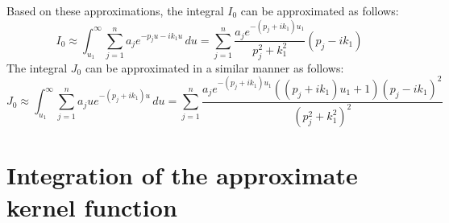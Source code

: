 \documentclass[12pt]{article}
\newcommand{\f}{\frac}
\begin{document}
Based on these approximations, the integral $I_{0}$ can be
approximated as follows:
%
\begin{equation*}
  I_{0} \approx \int_{u_{1}}^{\infty} \sum_{j=1}^{n} a_{j} e^{-p_{j}u - ik_{1}u} \, du 
  = \sum_{j=1}^{n} \f{a_{j}e^{-(p_{j} + i k_{1})u_{1}}}{p_{j}^2 + k_{1}^2} (p_{j} - i k_1)
\end{equation*}
%
The integral $J_{0}$ can be approximated in a similar manner as
follows:
%
\begin{equation*}
  J_{0} \approx \int_{u_{1}}^{\infty} \sum_{j=1}^{n} a_{j} u e^{-(p_{j} + ik_{1})u} \, du 
  = \sum_{j=1}^{n} \f{a_{j}e^{-(p_{j} + i k_{1})u_{1}}((p_{j} + i k_1)u_{1} + 1)(p_{j} - ik_{1})^2}{(p_{j}^2 + k_{1}^2)^2}
\end{equation*}

\section{Integration of the approximate kernel function}
\end{document}
